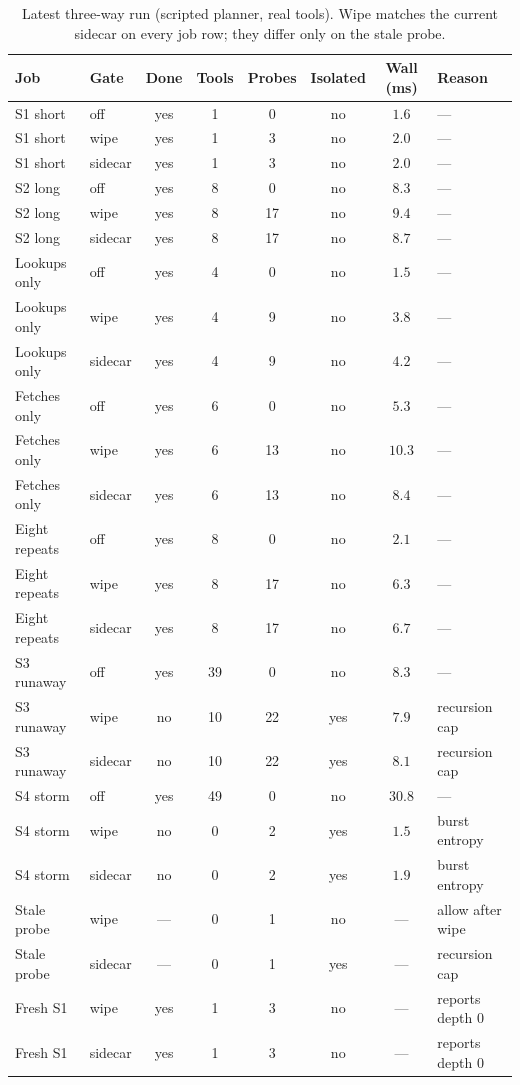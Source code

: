 \documentclass[11pt,a4paper]{article}
\begin{document}
\begin{table}[htbp]
\centering
\caption{Latest three-way run (scripted planner, real tools). Wipe matches the current sidecar on every job row; they differ only on the stale probe.}
\label{tab:baseline-jobs}
{\scriptsize
\begin{tabular}{@{}llcccccl@{}}
\toprule
Job & Gate & Done & Tools & Probes & Isolated & Wall (ms) & Reason \\
\midrule
S1 short & off & yes & 1 & 0 & no & $1.6$ & --- \\
S1 short & wipe & yes & 1 & 3 & no & $2.0$ & --- \\
S1 short & sidecar & yes & 1 & 3 & no & $2.0$ & --- \\
S2 long & off & yes & 8 & 0 & no & $8.3$ & --- \\
S2 long & wipe & yes & 8 & 17 & no & $9.4$ & --- \\
S2 long & sidecar & yes & 8 & 17 & no & $8.7$ & --- \\
Lookups only & off & yes & 4 & 0 & no & $1.5$ & --- \\
Lookups only & wipe & yes & 4 & 9 & no & $3.8$ & --- \\
Lookups only & sidecar & yes & 4 & 9 & no & $4.2$ & --- \\
Fetches only & off & yes & 6 & 0 & no & $5.3$ & --- \\
Fetches only & wipe & yes & 6 & 13 & no & $10.3$ & --- \\
Fetches only & sidecar & yes & 6 & 13 & no & $8.4$ & --- \\
Eight repeats & off & yes & 8 & 0 & no & $2.1$ & --- \\
Eight repeats & wipe & yes & 8 & 17 & no & $6.3$ & --- \\
Eight repeats & sidecar & yes & 8 & 17 & no & $6.7$ & --- \\
S3 runaway & off & yes & 39 & 0 & no & $8.3$ & --- \\
S3 runaway & wipe & no & 10 & 22 & yes & $7.9$ & recursion cap \\
S3 runaway & sidecar & no & 10 & 22 & yes & $8.1$ & recursion cap \\
S4 storm & off & yes & 49 & 0 & no & $30.8$ & --- \\
S4 storm & wipe & no & 0 & 2 & yes & $1.5$ & burst entropy \\
S4 storm & sidecar & no & 0 & 2 & yes & $1.9$ & burst entropy \\
Stale probe & wipe & --- & 0 & 1 & no & --- & allow after wipe \\
Stale probe & sidecar & --- & 0 & 1 & yes & --- & recursion cap \\
Fresh S1 & wipe & yes & 1 & 3 & no & --- & reports depth $0$ \\
Fresh S1 & sidecar & yes & 1 & 3 & no & --- & reports depth $0$ \\
\bottomrule
\end{tabular}
}
\end{table}
\end{document}
